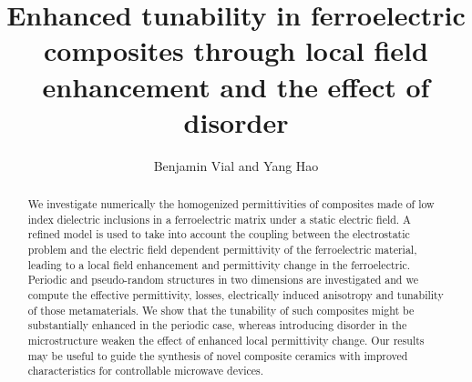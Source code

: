 \documentclass[%
 aip,
 amsmath,amssymb,
 reprint,%
linenumbers
]{revtex4-1}
\newcommand{\co}[1]{\textcolor{correction}{#1}}
\begin{document}
\title{\co{Enhanced tunability in ferroelectric composites through local field enhancement and the effect of disorder}}
\author{Benjamin Vial and Yang Hao}


%
%


%


\begin{abstract}
 We investigate \co{numerically} the homogenized permittivities of \co{composites} made of low index dielectric inclusions in a ferroelectric matrix under
 a static electric field. A refined model is used to take into account the coupling
 between the electrostatic problem and the electric field dependent permittivity of the
 ferroelectric material, leading to a local field enhancement and permittivity change in the ferroelectric.
 Periodic and pseudo-random structures in two dimensions are investigated and
 we \co{compute} the effective permittivity, losses, electrically induced anisotropy and tunability
 of those metamaterials. We show that the tunability of such composites might be substantially
 enhanced in the periodic case, \co{whereas} introducing disorder in the microstructure
 weaken the effect of enhanced local permittivity change. Our results may be useful to guide the synthesis of novel composite ceramics with improved characteristics for controllable microwave devices.
\end{abstract}

\maketitle
\end{document}
